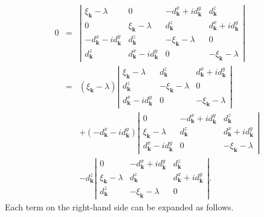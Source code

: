 \documentclass[uplatex,a4j,12pt,dvipdfmx]{jsarticle}
\begin{document}
\begin{eqnarray}
	0
	&=&
	\left|
	\begin{array}{cccc}
		{\xi_{\bm{k}}} - \lambda               & 0                                    & - {d^{x}_{\bm{k}}} + i{d^{y}_{\bm{k}}} & {d^{z}_{\bm{k}}}                     \\[2mm]
		0                                      & {\xi_{\bm{k}}} - \lambda             & {d^{z}_{\bm{k}}}                       & {d^{x}_{\bm{k}}} + i{d^{y}_{\bm{k}}} \\[2mm]
		- {d^{x}_{\bm{k}}} - i{d^{y}_{\bm{k}}} & {d^{z}_{\bm{k}}}                     & - {\xi_{\bm{k}}} -\lambda              & 0                                    \\[2mm]
		{d^{z}_{\bm{k}}}                       & {d^{x}_{\bm{k}}} - i{d^{y}_{\bm{k}}} & 0                                      & - {\xi_{\bm{k}}} -\lambda
	\end{array}
	\right|
	\nonumber \\[3mm] &=&
	({\xi_{\bm{k}}} - \lambda)
	\left|
	\begin{array}{ccc}
		{\xi_{\bm{k}}} - \lambda             & {d^{z}_{\bm{k}}}          & {d^{x}_{\bm{k}}} + i{d^{y}_{\bm{k}}} \\[2mm]
		{d^{z}_{\bm{k}}}                     & - {\xi_{\bm{k}}} -\lambda & 0                                    \\[2mm]
		{d^{x}_{\bm{k}}} - i{d^{y}_{\bm{k}}} & 0                         & - {\xi_{\bm{k}}} -\lambda
	\end{array}
	\right|
	\nonumber \\[3mm] && +
	(- {d^{x}_{\bm{k}}} - i{d^{y}_{\bm{k}}})
	\left|
	\begin{array}{ccc}
		0                                    & - {d^{x}_{\bm{k}}} + i{d^{y}_{\bm{k}}} & {d^{z}_{\bm{k}}}                     \\[2mm]
		{\xi_{\bm{k}}} - \lambda             & {d^{z}_{\bm{k}}}                       & {d^{x}_{\bm{k}}} + i{d^{y}_{\bm{k}}} \\[2mm]
		{d^{x}_{\bm{k}}} - i{d^{y}_{\bm{k}}} & 0                                      & - {\xi_{\bm{k}}} -\lambda
	\end{array}
	\right|
	\nonumber \\[3mm] && -
	{d^{z}_{\bm{k}}}
	\left|
	\begin{array}{ccc}
		0                        & - {d^{x}_{\bm{k}}} + i{d^{y}_{\bm{k}}} & {d^{z}_{\bm{k}}}                     \\[2mm]
		{\xi_{\bm{k}}} - \lambda & {d^{z}_{\bm{k}}}                       & {d^{x}_{\bm{k}}} + i{d^{y}_{\bm{k}}} \\[2mm]
		{d^{z}_{\bm{k}}}         & - {\xi_{\bm{k}}} -\lambda              & 0
	\end{array}
	\right|
	.
\end{eqnarray}
%
Each term on the right-hand side can be expanded as follows.
\end{document}
